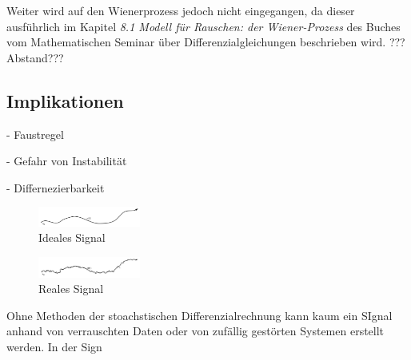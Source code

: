 Weiter wird auf den Wienerprozess jedoch nicht eingegangen, da dieser ausführlich im Kapitel \glqq \textit{8.1 Modell für Rauschen: der Wiener-Prozess}\glqq{} des Buches vom Mathematischen Seminar über Differenzialgleichungen beschrieben wird. ???Abstand???



\subsection{Implikationen\label{brown:Rauschen:Implikationen}}
- Faustregel

- Gefahr von Instabilität

- Differnezierbarkeit
\begin{figure}
	\centering
	\includegraphics[width=0.3\textwidth]{papers/brown/images/idealSignal.png}
	\caption{Ideales Signal}
	\label{idealSignal}
\end{figure}
\begin{figure}
	\centering
	\includegraphics[width=0.3\textwidth]{papers/brown/images/realSignal.png}
	\caption{Reales Signal}
	\label{realSignal}
\end{figure}

Ohne Methoden der stoachstischen Differenzialrechnung kann kaum ein SIgnal anhand von verrauschten Daten oder von zufällig gestörten Systemen erstellt werden. In der Sign